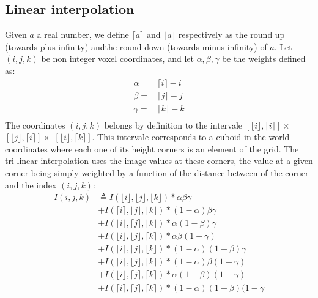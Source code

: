 \subsection{Linear interpolation}

Given $a$ a real number, we define $\lceil a \rceil$ and $\lfloor a \rfloor$ respectively as the round up (towards plus infinity) andthe round down (towards minus infinity) of $a$. Let $(i,j,k)$ be non integer voxel coordinates, and let $\alpha, \beta, \gamma$ be the weights defined as:
%
\begin{align}
\alpha= & \lceil i \rceil - i \\
\beta=  & \lceil j \rceil - j \\
\gamma= & \lceil k \rceil - k \\
\end{align}
%
The coordinates $(i,j,k)$ belongs by definition to the intervale $[ \lfloor i \rfloor , \lceil i \rceil]\times$ $[ \lfloor j \rfloor , \lceil i \rceil]\times$ $[ \lfloor i \rfloor , \lceil k \rceil]$. This intervale corresponds to a cuboid in the world coordinates where each one of its height corners is an element of the grid. The tri-linear interpolation uses the image values at these corners, the value at a given corner being simply weighted by a function of the distance between of the corner and the index $(i,j,k)$:
%
\begin{align}
\nonumber I(i,j,k) & \triangleq I(\lfloor i \rfloor, \lfloor j \rfloor, \lfloor k \rfloor) * \alpha \beta \gamma\\
\nonumber          & + I(\lceil  i \rceil , \lfloor j \rfloor, \lfloor k \rfloor) * (1-\alpha)\beta\gamma\\
\nonumber          & + I(\lfloor i \rfloor, \lceil  j \rceil , \lfloor k \rfloor) * \alpha (1-\beta) \gamma\\
\nonumber          & + I(\lfloor i \rfloor, \lfloor j \rfloor, \lceil  k \rceil ) * \alpha\beta(1-\gamma)\\
\nonumber          & + I(\lceil  i \rceil , \lceil  j \rceil , \lfloor k \rfloor) * (1-\alpha) (1-\beta) \gamma\\
\nonumber          & + I(\lceil  i \rceil , \lfloor j \rfloor, \lceil  k \rceil ) * (1-\alpha)\beta(1-\gamma)\\
\nonumber          & + I(\lfloor i \rfloor, \lceil  j \rceil , \lceil  k \rceil ) * \alpha(1-\beta)(1-\gamma)\\
                   & + I(\lceil  i \rceil , \lceil  j \rceil , \lceil  k \rceil ) * (1-\alpha)(1-\beta)(1-\gamma                   \label{eq:images:interpolation:linear}
\end{align}
